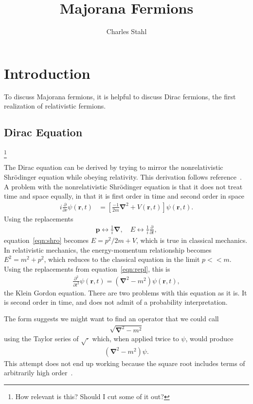 \documentclass[12pt]{article} %
\newcommand{\pdop}[1]{\frac{\partial}{\partial #1}}
\newcommand{\grad}{\bm\nabla}
\renewcommand{\th}[1]{\frac{1}{#1}}
\begin{document}
\title{\textbf{Majorana Fermions}}
\author{Charles Stahl}

\maketitle

\section{Introduction} 

To discuss Majorana fermions, it is helpful to discuss Dirac fermions, the first realization of relativistic fermions.

\subsection{Dirac Equation}\footnote{How relevant is this? Should I cut some of it out?} \emph{}

The Dirac equation can be derived by trying to mirror the nonrelativistic Shr\"odinger equation while obeying relativity. This derivation follows reference~\cite{gottfried03}. A problem with the nonrelativistic Shr\"odinger equation is that it does not treat time and space equally, in that it is first order in time and second order in space
\begin{align}
i\pdop{r}\psi(\bm r, t) &= \left[\frac{-1}{2m}\grad^2 +V(\bm r,t)\right]
	\psi(\bm r, t). \label{eqn:shro}
\end{align}
Using the replacements
\begin{align}
\bm p \leftrightarrow \th{i}\grad, \quad E \leftrightarrow \th{i}\pdop{t}, 
	\label{eqn:repl}
\end{align}
equation~\ref{eqn:shro} becomes $E = p^2/2m +V$, which is true in classical mechanics. In relativistic mechanics, the energy-momentum relationship becomes $E^2 = m^2 +p^2$, which reduces to the classical equation in the limit $p<<m$. Using the replacements from equation~\ref{eqn:repl}, this is
\begin{align}
\frac{\partial^2}{\partial t^2}\psi(\bm r,t)=\left(\grad^2-m^2\right)\psi
	(\bm r,t),\label{eqn:klein}
\end{align}
the Klein Gordon equation. There are two problems with this equation as it is. It is second order in time, and does not admit of a probability interpretation.

The form suggests we might want to find an operator that we could call 
\begin{align}
\sqrt{\grad^2-m^2}
\end{align}
using the Taylor series of $\sqrt{\cdot}$ which, when applied twice to $\psi$, would produce
\begin{align}
(\grad^2-m^2)\psi.
\end{align}
This attempt does not end up working because the square root includes terms of arbitrarily high order~\cite{sakurai11}.
\end{document}
